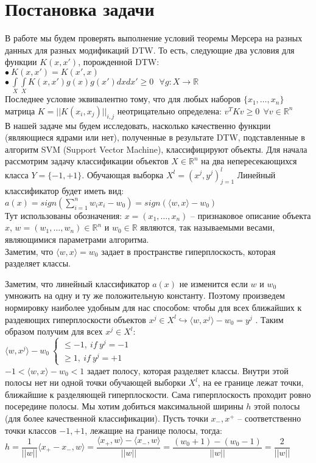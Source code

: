 \documentclass[12pt, twoside]{article}
\begin{document}
\section{Постановка задачи}
В работе мы будем проверять выполнение условий теоремы Мерсера на разных данных для разных модификаций DTW. То есть, следующие два условия для функции $K(x,x')$, порожденной DTW:\\
$\bullet \ K(x,x') = K(x',x)$\\
$\bullet \ \int\limits_X \int\limits_X K(x,x')g(x)g(x')dxdx' \geq 0 \ \ \ \forall g:X \rightarrow \mathbb{R}$\\
Последнее условие эквивалентно тому, что для любых наборов $\{ x_1, \ldots, x_n \}$ матрица $K = ||K(x_i,x_j)||_{i,j}$ неотрицательно определена: $v^TKv \geq 0 \ \ \forall v \in \mathbb{R}^n$\\

В нашей задаче мы будем исследовать, насколько качественно функции (являющиеся ядрами или нет), полученные в результате DTW, подставленные в алгоритм SVM (Support Vector Machine), классифицируют объекты. Для начала рассмотрим задачу классификации объектов $X \in \mathbb{R}^n$ на два непересекающихся класса $Y = \{-1, +1 \}$. Обучающая выборка $X^l = (x^j,y^j)_{j=1}^l$ Линейный классификатор будет иметь вид:\\
$a(x) = sign(\sum\limits_{i=1}^n w_ix_i - w_0) = sign(\langle w,x \rangle - w_0)$\\
Тут использованы обозначения: $x = (x_1, \ldots, x_n) $ --  признаковое описание объекта $x$, $w = ( w_1, \ldots , w_n)  \in \mathbb{R}^n $ и $w_0 \in \mathbb{R}$ являются, так называемыми весами, являющимися параметрами алгоритма.\\
Заметим, что $\langle w,x \rangle = w_0$ задает в пространстве гиперплоскость, которая разделяет классы.

Заметим, что линейный классификатор $a(x)$ не изменится если $w$ и $w_0$ умножить на одну и ту же положительную константу. Поэтому произведем нормировку наиболее удобным для нас способом: чтобы для всех ближайших к раздеяющих гиперплоскости объектов $x^j \in X^l \hookrightarrow \langle w, x^j \rangle - w_0 = y^j$ . Таким образом получим для всех $x^j \in X^l$:\\
$\langle w, x^j \rangle - w_0 \ \begin{cases}  \leq -1, \ if \ y^j = -1 \\ \geq 1, \  if \  y^j = +1 \end{cases}$\\
$-1 < \langle w,x \rangle - w_0 < 1$ задает полосу, которая разделяет классы.  Внутри этой полосы нет ни одной точки обучающей выборки $X^l$, на ее границе лежат точки, ближайшие к разделяющей гиперплоскости. Сама гиперплоскость проходит ровно посередине полосы.
Мы хотим добиться максимальной ширины $h$ этой полосы (для более качественной классификации). Пусть точки $x_{-}, x^{+}$ -- соответственно точки классов $-1, +1$, лежащие на границе полосы, тогда:
$h = \dfrac{1}{||w||} \langle x_{+} - x_{-}, w \rangle = \dfrac{\langle x_{+}, w \rangle - \langle x_{-}, w \rangle}{||w||} = \dfrac{(w_0 + 1) - (w_0 - 1)}{||w||} = \dfrac{2}{||w||}$\\
\end{document}
